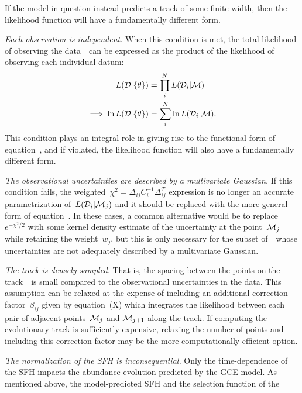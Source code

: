 \documentclass[ms.tex]{subfiles}
\begin{document}
If the model in question instead predicts a track of some finite width, then
the likelihood function will have a fundamentally different form.
\par
\textit{Each observation is independent.}
When this condition is met, the total likelihood of observing the
data~~can be expressed as the product of the likelihood of observing
each individual datum:
\begin{subequations}\begin{align}
L(\mathcal{D} | \{\theta\}) &= \prod_i^N L(\mathcal{D}_i | \mathcal{M})
\\
\implies \ln L(\mathcal{D} | \{\theta\}) &= \sum_i^N \ln
L(\mathcal{D}_i | \mathcal{M}).
\end{align}\end{subequations}
This condition plays an integral role in giving rise to the functional form of
equation~, and if violated, the likelihood function will
also have a fundamentally different form.
\par
\textit{The observational uncertainties are described by a multivariate
Gaussian.}
If this condition fails, the weighted~$\chi^2 = \Delta_{ij}C_i^{-1}\Delta_{ij}^T$
expression is no longer an accurate parametrization of~$L(\mathcal{D}_i |
\mathcal{M}_j)$ and it should be replaced with the more general form of
equation~.
In these cases, a common alternative would be to replace~$e^{-\chi^2 / 2}$ with
some kernel density estimate of the uncertainty at the point~$\mathcal{M}_j$
while retaining the weight~$w_j$, but this is only necessary for the subset
of~~whose uncertainties are not adequately described by a
multivariate Gaussian.
\par
\textit{The track is densely sampled.}
That is, the spacing between the points on the track~~is small
compared to the observational uncertainties in the data.
This assumption can be relaxed at the expense of including an additional
correction factor~$\beta_{ij}$ given by equation~(X) which integrates the
likelihood between each pair of adjacent points~$\mathcal{M}_j$ and
$\mathcal{M}_{j + 1}$ along the track.
If computing the evolutionary track is sufficiently expensive, relaxing the
number of points and including this correction factor may be the more
computationally efficient option.
\par
\textit{The normalization of the SFH is inconsequential.}
Only the time-dependence of the SFH impacts the abundance evolution predicted
by the GCE model.
As mentioned above, the model-predicted SFH and the selection function of the
\end{document}
